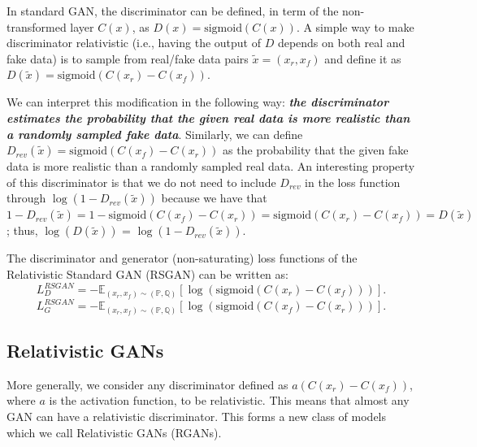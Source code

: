 \documentclass{article}
\begin{document}
In standard GAN, the discriminator can be defined, in term of the non-transformed layer $C(x)$, as $D(x)=\text{sigmoid}(C(x))$. A simple way to make discriminator relativistic (i.e., having the output of $D$ depends on both real and fake data) is to sample from real/fake data pairs $\tilde{x}=(x_r,x_f)$ and define it as $D(\tilde{x}) = \text{sigmoid}(C(x_r)-C(x_f))$. 

We can interpret this modification in the following way: \textbf{\textit{the discriminator estimates the probability that the given real data is more realistic than a randomly sampled fake data}}. Similarly, we can define $D_{rev}(\tilde{x}) = \text{sigmoid}(C(x_f)-C(x_r))$ as the probability that the given fake data is more realistic than a randomly sampled real data. An interesting property of this discriminator is that we do not need to include $D_{rev}$ in the loss function through $\log(1-D_{rev}(\tilde{x}))$ because we have that $1-D_{rev}(\tilde{x}) = 1 - \text{sigmoid}(C(x_f)-C(x_r)) = \text{sigmoid}(C(x_r)-C(x_f)) = D(\tilde{x})$; thus, $\log(D(\tilde{x}))$ = $\log(1-D_{rev}(\tilde{x}))$.

The discriminator and generator (non-saturating) loss functions of the Relativistic Standard GAN (RSGAN) can be written as:
\begin{equation}
L_D^{RSGAN} = -\mathbb{E}_{(x_r,x_f) \sim (\mathbb{P},\mathbb{Q})}\left[ \log (\text{sigmoid}(C(x_r)-C(x_f))) \right].
\end{equation}
\begin{equation}
L_G^{RSGAN} = -\mathbb{E}_{(x_r,x_f) \sim (\mathbb{P},\mathbb{Q})}\left[ \log (\text{sigmoid}(C(x_f)-C(x_r))) \right].
\end{equation}

\subsection{Relativistic GANs}

More generally, we consider any discriminator defined as $a(C(x_r)-C(x_f))$, where $a$ is the activation function, to be relativistic. This means that almost any GAN can have a relativistic discriminator. This forms a new class of models which we call Relativistic GANs (RGANs). 
\end{document}

